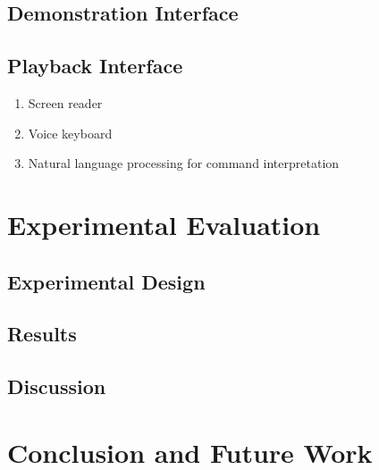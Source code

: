 \documentclass[letterpaper]{article}
\begin{document}

\subsection{Demonstration Interface}

\subsection{Playback Interface}




\begin{enumerate}
\item Screen reader
\item Voice keyboard
\item Natural language processing for command interpretation
\end{enumerate}

\section{Experimental Evaluation}
\subsection{Experimental Design}

\subsection{Results}

\subsection{Discussion}

\section{Conclusion and Future Work}
\end{document}
